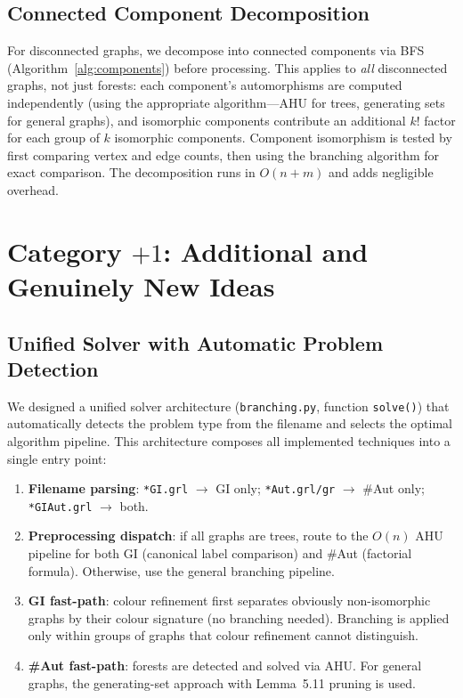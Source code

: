 \documentclass[twoside]{article}
\begin{document}
\subsection{Connected Component Decomposition}

For disconnected graphs, we decompose into connected components via BFS (Algorithm~\ref{alg:components}) before processing. This applies to \emph{all} disconnected graphs, not just forests: each component's automorphisms are computed independently (using the appropriate algorithm---AHU for trees, generating sets for general graphs), and isomorphic components contribute an additional $k!$ factor for each group of $k$ isomorphic components. Component isomorphism is tested by first comparing vertex and edge counts, then using the branching algorithm for exact comparison. The decomposition runs in $O(n + m)$ and adds negligible overhead.


\section{Category $+1$: Additional and Genuinely New Ideas}

\subsection{Unified Solver with Automatic Problem Detection}

We designed a unified solver architecture (\texttt{branching.py}, function \texttt{solve()}) that automatically detects the problem type from the filename and selects the optimal algorithm pipeline. This architecture composes all implemented techniques into a single entry point:

\begin{enumerate}
\item \textbf{Filename parsing}: \texttt{*GI.grl} $\to$ GI only; \texttt{*Aut.grl/gr} $\to$ \#Aut only; \texttt{*GIAut.grl} $\to$ both.
\item \textbf{Preprocessing dispatch}: if all graphs are trees, route to the $O(n)$ AHU pipeline for both GI (canonical label comparison) and \#Aut (factorial formula). Otherwise, use the general branching pipeline.
\item \textbf{GI fast-path}: colour refinement first separates obviously non-isomorphic graphs by their colour signature (no branching needed). Branching is applied only within groups of graphs that colour refinement cannot distinguish.
\item \textbf{\#Aut fast-path}: forests are detected and solved via AHU. For general graphs, the generating-set approach with Lemma~5.11 pruning is used.
\end{enumerate}
\end{document}
